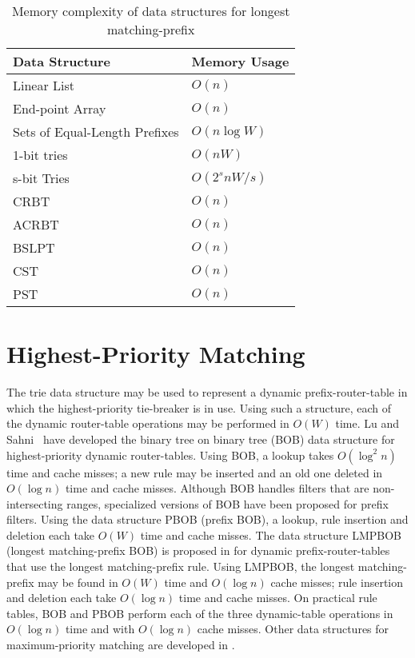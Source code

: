 \begin{table*}
\centering
\begin{tabular}{|p{2in}|l|}
Data Structure                     & Memory Usage \\ \hline
Linear List                                    & $O(n)$   \\ \hline
End-point Array            & $O(n)$ \\ \hline
Sets of Equal-Length Prefixes   & $O(n\log W)$ \\ \hline
1-bit tries           & $O(nW)$ \\ \hline
s-bit Tries             & $O(2^snW/s)$ \\ \hline
CRBT                    & $O(n)$ \\ \hline
ACRBT               & $O(n)$ \\ \hline
BSLPT           & $O(n)$ \\ \hline
CST             & $O(n)$ \\ \hline
PST             & $O(n)$ \\
\end{tabular}\vspace{0.1in}
\caption{Memory complexity of data structures for longest matching-prefix}
\label{tab:lmpb}
\end{table*}

\section{Highest-Priority Matching}
The trie data structure may be used to represent a dynamic prefix-router-table in
which the highest-priority tie-breaker is in use. Using such a structure,
each of the dynamic router-table operations may be performed in $O(W)$
time. Lu and Sahni~\cite{lu1} have
developed the binary tree
on binary tree (BOB) data structure for highest-priority dynamic router-tables.
Using BOB,
a lookup takes
$O(\log ^2 n)$ time and cache misses;
a new rule may be inserted and an old one deleted in
$O(\log n)$ time and cache misses.
Although BOB handles filters that are non-intersecting ranges,
specialized versions of BOB have been proposed for prefix filters.
Using the data structure PBOB
(prefix BOB), a lookup, rule insertion
and deletion each
take $O(W)$ time and cache misses.
The data structure LMPBOB (longest matching-prefix BOB) is proposed
in \cite{lu1} for dynamic prefix-router-tables that use the longest
matching-prefix rule.
Using LMPBOB,
the longest matching-prefix may be found in $O(W)$ time and $O(\log n)$
cache misses; rule insertion and deletion
each take $O(\log n)$ time and cache misses.
On practical rule tables, BOB and PBOB perform each
of the three dynamic-table operations in $O(\log n)$ time and with
$O(\log n)$ cache misses.
Other
data structures for maximum-priority matching are developed in
\cite{feld,gupta}.

